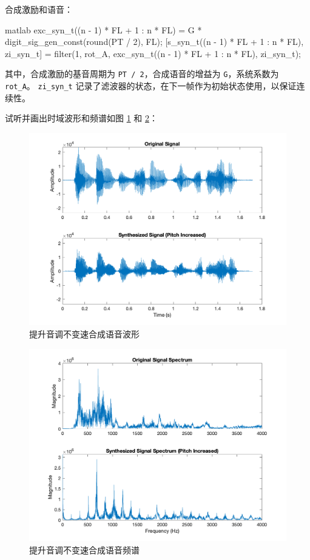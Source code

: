 \documentclass[a4paper]{article}  %
\begin{document}
合成激励和语音：
\begin{codeblock}{matlab}
exc_syn_t((n - 1) * FL + 1 : n * FL) = G * digit_sig_gen_const(round(PT / 2), FL);
[s_syn_t((n - 1) * FL + 1 : n * FL), zi_syn_t] = filter(1, rot_A, exc_syn_t((n - 1) * FL + 1 : n * FL), zi_syn_t);
\end{codeblock}

其中，合成激励的基音周期为 \texttt{PT / 2}，合成语音的增益为 \texttt{G}，系统系数为 \texttt{rot\_A}。
\texttt{zi\_syn\_t} 记录了滤波器的状态，在下一帧作为初始状态使用，以保证连续性。

试听并画出时域波形和频谱如图 \ref{fig:1_13_pitch_increased_signal_t} 和 \ref{fig:1_13_pitch_increased_signal_f}：

\begin{figure}[ht]
    \centering
    \includegraphics[width=.6\textwidth]{asserts/1_13_pitch_increased_signal_t.png}
    \caption{
        提升音调不变速合成语音波形
    }\label{fig:1_13_pitch_increased_signal_t}
\end{figure}

\begin{figure}[ht]
    \centering
    \includegraphics[width=.6\textwidth]{asserts/1_13_pitch_increased_signal_f.png}
    \caption{
        提升音调不变速合成语音频谱
    }\label{fig:1_13_pitch_increased_signal_f}
\end{figure}
\end{document}
